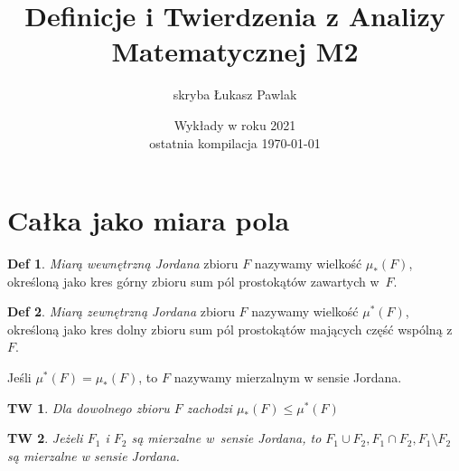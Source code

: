 \documentclass[a4paper, 12pt]{mwart}
\author{skryba Łukasz Pawlak}
\title{Definicje i Twierdzenia z Analizy Matematycznej M2}
\date{Wykłady w roku 2021 \\ ostatnia kompilacja \today}
\theoremstyle{definition}
\newtheorem{definicja}{Def}[section]
\theoremstyle{plain}
\newtheorem{twierdzenie}{TW}[section]
\theoremstyle{remark}
\begin{document}
\maketitle

\section{Całka jako miara pola}
\begin{definicja}
	\emph{Miarą wewnętrzną Jordana} zbioru $F$ nazywamy  wielkość $\mu_*(F)$, określoną jako kres górny zbioru sum pól prostokątów zawartych w~$F$.
\end{definicja}
\begin{definicja}
	\emph{Miarą zewnętrzną Jordana} zbioru $F$ nazywamy  wielkość $\mu^*(F)$, określoną jako kres dolny zbioru sum pól prostokątów mających część wspólną z~$F$.
\end{definicja}
Jeśli $\mu^*(F) = \mu_*(F)$, to $F$ nazywamy mierzalnym w sensie Jordana.
\begin{twierdzenie}
	Dla dowolnego zbioru $F$ zachodzi
	$\mu_*(F) \leq \mu^*(F)$
\end{twierdzenie}
\begin{twierdzenie}
	Jeżeli $F_1$ i $F_2$ są mierzalne w~sensie Jordana, to
	$F_1\cup F_2, F_1\cap F_2, F_1\setminus F_2$
	są mierzalne w sensie Jordana. 
\end{twierdzenie}
\end{document}
